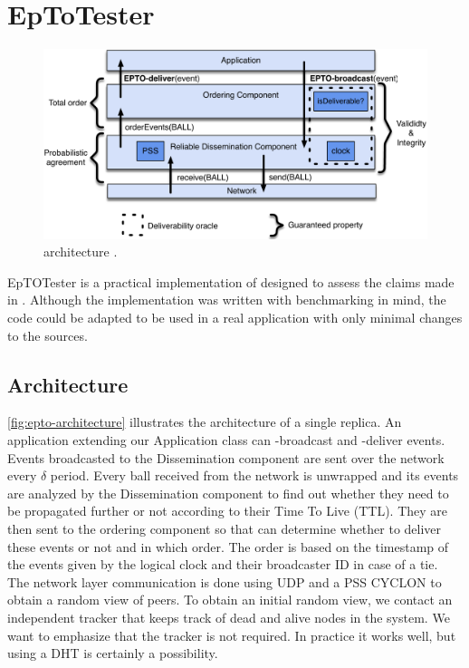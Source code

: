\section{EpToTester}
\label{sec:epto}
\begin{figure}[htp]
	\includegraphics[width=\linewidth]{figures/architecture.pdf}
	\caption{\epto architecture \autocite{matos2015epto}.}
	\label{fig:epto-architecture}
\end{figure}
EpTOTester is a practical implementation of \epto designed to assess the claims made in \autocite{matos2015epto}. Although the implementation was written with benchmarking in mind, the code could be adapted to be used in a real application with only minimal changes to the sources.
\subsection{Architecture}
\autoref{fig:epto-architecture} illustrates the architecture of a single replica. An application extending our Application class can \epto-broadcast and \epto-deliver events. Events broadcasted to the Dissemination component are sent over the network every $\delta$ period. Every ball received from the network is unwrapped and its events are analyzed by the Dissemination component to find out whether they need to be propagated further or not according to their Time To Live (TTL). They are then sent to the ordering component so that \epto can determine whether to deliver these events or not and in which order. The order is based on the timestamp of the events given by the logical clock and their broadcaster ID in case of a tie. The network layer communication is done using UDP and a PSS CYCLON to obtain a random view of peers. To obtain an initial random view, we contact an independent tracker that keeps track of dead and alive nodes in the system. We want to emphasize that the tracker is not required. In practice it works well, but using a DHT is certainly a possibility.
